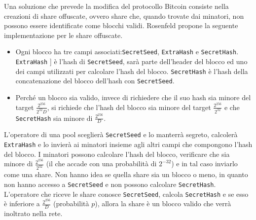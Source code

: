 Una soluzione che prevede la modifica del protocollo Bitcoin consiste nella creazioni di share offuscate, ovvero share che, quando trovate dai minatori, non possono essere identificate come blocchi validi.    Rosenfeld propone la seguente implementazione per le share offuscate.
\begin{itemize}
    \item Ogni blocco ha tre campi associati:\verb|SecretSeed|, \verb|ExtraHash| e \verb|SecretHash|. \verb|ExtraHash| ] è l'hash di \verb|SecretSeed|, sarà parte dell'header del blocco ed uno dei campi utilizzati per calcolare l'hash del blocco. \verb|SecretHash| è l'hash della concatenazione del blocco dell'hash con \verb|SecretSeed|.
    \item Perché un blocco sia valido, invece di richiedere che il suo hash sia minore del target $\frac{2^256}{2^32 D}$, si richiede che l'hash del blocco sia minore del target $\frac{2^256}{2^32}$ e che \verb|SecretHash| sia minore di $\frac{2^256}{D}$.
\end{itemize}
L'operatore di una pool sceglierà \verb|SecretSeed| e lo manterrà segreto, calcolerà \verb|ExtraHash| e lo invierà ai minatori insieme agli altri campi che compongono l'hash del blocco. I minatori possono calcolare l'hash del blocco, verificare che sia minore di $\frac{2^256}{2^32}$ (il che accade con una probabilità di $2^{-32}$) e in tal caso inviarlo come una share. Non hanno idea se quella share sia un blocco o meno, in quanto non hanno accesso a \verb|SecretSeed| e non possono calcolare \verb|SecretHash|. L'operatore che riceve le share conosce \verb|SecretSeed|, calcola \verb|SecretHash| e se esso è inferiore a $\frac{2^256}{D}$ (probabilità $p$), allora la share è un blocco valido che verrà inoltrato nella rete.



